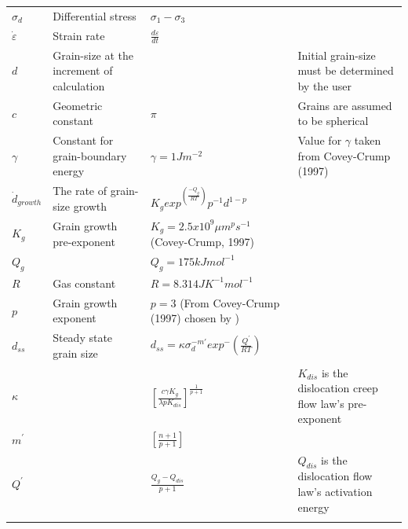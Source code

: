 \documentclass[]{scrreprt}
\begin{document}
\begin{table}
\begin{tabular}{| L{1.3cm} | C{3.95cm} | C{5.25cm} | C{4.95cm} |}
$\sigma_{d}$ & {\small Differential stress} & $\sigma_{1} - \sigma_{3}$ &  \\

$\dot{\varepsilon}$ & {\small Strain rate} & $\frac{d\varepsilon}{dt}$ &  \\

$d$ & {\small Grain-size at the increment of calculation} &  & {\small Initial grain-size must be determined by the user} \\
$c$ & {\small Geometric constant} & $\pi$ & {\small Grains are assumed to be spherical \citep{Austin2009}} \\

$\gamma$ & {\small Constant for grain-boundary energy} & $\gamma = 1 Jm^{-2}$ & {\small Value for $\gamma$ taken from Covey-Crump (1997)} \\

$\dot{d}_{growth}$ & {\small The rate of grain-size growth} & $K_g exp^{\left(\frac{-Q_g}{RT}\right)} p^{-1} d^{1-p}$ &  \\

$K_g$ & {\small Grain growth pre-exponent} & $K_g = 2.5x10^9 \mu m^{p}s^{-1}$ {\footnotesize (Covey-Crump, 1997)} & \\

$Q_g$ &  & $Q_g = 175 kJ mol^{-1}$ {\footnotesize {}} &  \\

$R$ & {\small Gas constant} & $R = 8.314 JK^{-1}mol^{-1}$  &  \\

$p$ & {\small Grain growth exponent} & $p = 3$ {\footnotesize (From Covey-Crump (1997) chosen by \citet{Herwegh2014})} &  \\

$d_{ss}$ & Steady state grain size & $d_{ss} = \kappa \sigma_{d}^{-m'} exp^-{\left(\frac{Q^{'}}{RT}\right)}$  &  \\

$\kappa$ &  & $\left[\frac{c \gamma K_g}{\lambda p K_{dis}}\right]^{\frac{1}{p+1}}$ & {\small 

$K_{dis}$ is the dislocation creep flow law's pre-exponent} \\

$m^{'}$ &  & $\left[\frac{n+1}{p+1}\right]$ &  \\

$Q^{'}$ &  & $\frac{Q_g-Q_{dis}}{p+1}$ & {\small $Q_{dis}$ is the dislocation flow law's activation energy} \\
\noalign{\smallskip}\hline
\end{tabular}
\end{table}
\end{document}
